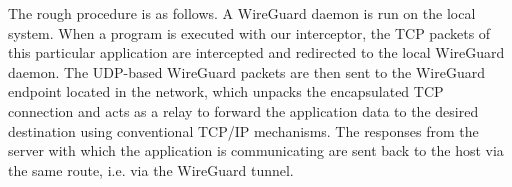 The rough procedure is as follows.
A WireGuard daemon is run on the local system.
When a program is executed with our interceptor, the TCP packets of this particular application are intercepted and redirected to the local WireGuard daemon.
The UDP-based WireGuard packets are then sent to the WireGuard endpoint located in the network, which unpacks the encapsulated TCP connection and acts as a relay to forward the application data to the desired destination using conventional TCP/IP mechanisms.
The responses from the server with which the application is communicating are sent back to the host via the same route, i.e. via the WireGuard tunnel.


